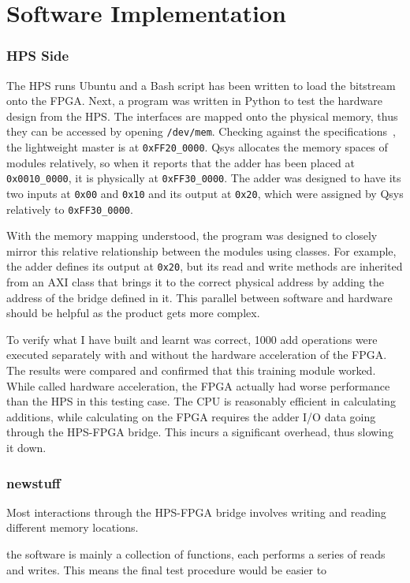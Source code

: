 \section{Software Implementation}

\subsubsection{HPS Side}
The HPS runs Ubuntu and a Bash script has been written to load the bitstream onto the FPGA.
Next, a program was written in Python to test the hardware design from the HPS.
The interfaces are mapped onto the physical memory, thus they can be accessed by opening \texttt{/dev/mem}.
Checking against the specifications~\cite{Altera6}, the lightweight master is at \texttt{0xFF20\_0000}.
Qsys allocates the memory spaces of modules relatively, so when it reports that the adder has been placed at \texttt{0x0010\_0000}, it is physically at \texttt{0xFF30\_0000}.
The adder was designed to have its two inputs at \texttt{0x00} and \texttt{0x10} and its output at \texttt{0x20}, which were assigned by Qsys relatively to \texttt{0xFF30\_0000}.

With the memory mapping understood, the program was designed to closely mirror this relative relationship between the modules using classes.
For example, the adder defines its output at \texttt{0x20}, but its read and write methods are inherited from an AXI class that brings it to the correct physical address by adding the address of the bridge defined in it.
This parallel between software and hardware should be helpful as the product gets more complex.

To verify what I have built and learnt was correct, 1000 add operations were executed separately with and without the hardware acceleration of the FPGA.
The results were compared and confirmed that this training module worked.
While called hardware acceleration, the FPGA actually had worse performance than the HPS in this testing case.
The CPU is reasonably efficient in calculating additions, while calculating on the FPGA requires the adder I/O data going through the HPS-FPGA bridge.
This incurs a significant overhead, thus slowing it down.

\subsubsection{newstuff}
Most interactions through the HPS-FPGA bridge involves writing and reading different memory locations.

the software is mainly a collection of functions, each performs a series of reads and writes.
This means the final test procedure would be easier to 